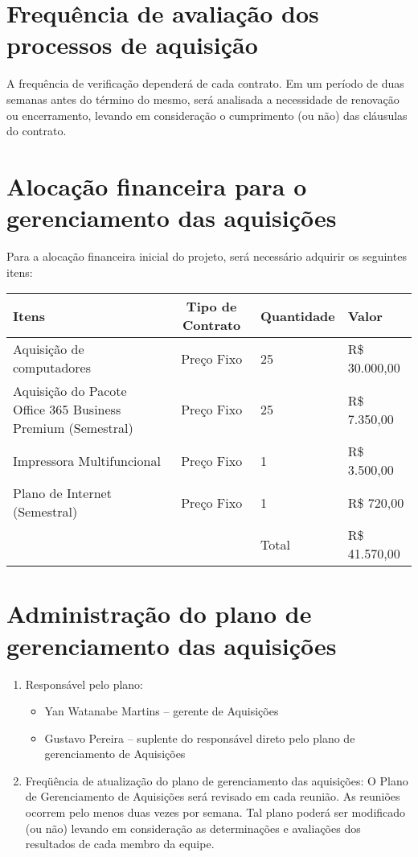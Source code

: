 \documentclass[12pt,openright,oneside,a4paper,brazil]{abntex2}
\begin{document}
\section{Frequência de avaliação dos processos de aquisição}
A frequência de verificação dependerá de cada contrato. Em um período de duas semanas antes do término do mesmo, será analisada a necessidade de renovação ou encerramento, levando em consideração o cumprimento (ou não) das cláusulas do contrato.

\section{Alocação financeira para o gerenciamento das aquisições}
Para a alocação financeira  inicial do projeto, será necessário adquirir os seguintes itens:
\begin{table}[h]
\centering
\begin{tabular}{|p{7cm}|c|p{2cm}|p{2.5cm}|}
Itens & Tipo de Contrato & Quantidade & Valor\\
\hline
Aquisição de computadores & Preço Fixo	& 25 & R\$ 30.000,00 \\
\hline
Aquisição do Pacote Office 365 Business Premium (Semestral)	& Preço Fixo & 25 & R\$ 7.350,00\\
\hline
Impressora Multifuncional & Preço Fixo & 1 & R\$ 3.500,00\\
\hline
Plano de Internet (Semestral) & Preço Fixo & 1 & R\$ 720,00\\
\hline
 & & Total & R\$ 41.570,00
\end{tabular}
\end{table}

\section{Administração do plano de gerenciamento das aquisições}
\begin{enumerate}
\item Responsável pelo plano:
\begin{itemize}
\item Yan Watanabe Martins – gerente de Aquisições
\item Gustavo Pereira – suplente do responsável direto pelo plano de gerenciamento de Aquisições
\end{itemize}
\item Freqüência de atualização do plano de gerenciamento das aquisições:
O Plano de Gerenciamento de Aquisições será revisado em cada reunião. As reuniões ocorrem pelo menos duas vezes por semana. Tal plano poderá ser modificado (ou não) levando em consideração as determinações e avaliações dos resultados de cada membro da equipe. 
\end{enumerate}
\end{document}
